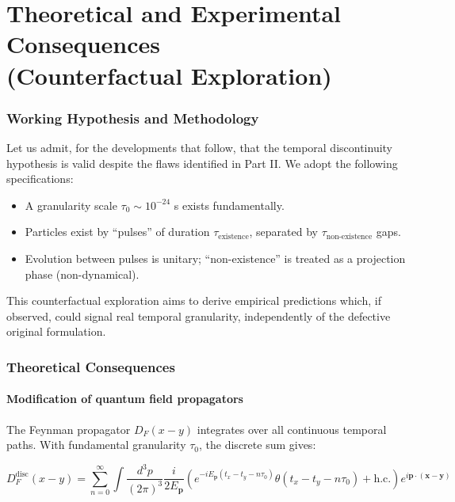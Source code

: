 \documentclass[11pt,a4paper]{article}
\begin{document}
\part{Theoretical and Experimental Consequences\\(Counterfactual Exploration)}

\section{Working Hypothesis and Methodology}

Let us admit, for the developments that follow, that the temporal discontinuity hypothesis is valid despite the flaws identified in Part II. We adopt the following specifications:

\begin{itemize}[leftmargin=*]
    \item A granularity scale $\tau_0 \sim 10^{-24}$ s exists fundamentally.
    \item Particles exist by ``pulses'' of duration $\tau_{\text{existence}}$, separated by $\tau_{\text{non-existence}}$ gaps.
    \item Evolution between pulses is unitary; ``non-existence'' is treated as a projection phase (non-dynamical).
\end{itemize}

This counterfactual exploration aims to derive empirical predictions which, if observed, could signal real temporal granularity, independently of the defective original formulation.

\section{Theoretical Consequences}

\subsection{Modification of quantum field propagators}

The Feynman propagator $D_F(x-y)$ integrates over all continuous temporal paths. With fundamental granularity $\tau_0$, the discrete sum gives:

\begin{equation}\label{eq:discrete_propagator}
D_F^{\text{disc}}(x-y) = \sum_{n=0}^{\infty} \int \frac{d^3p}{(2\pi)^3} \frac{i}{2E_{\mathbf{p}}} \left( e^{-iE_{\mathbf{p}}(t_x-t_y-n\tau_0)} \theta(t_x-t_y-n\tau_0) + \text{h.c.} \right) e^{i\mathbf{p}\cdot(\mathbf{x}-\mathbf{y})}
\end{equation}
\end{document}
